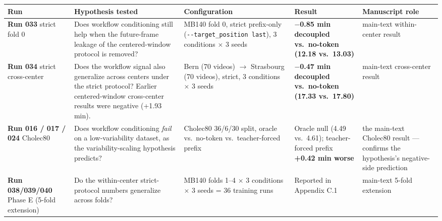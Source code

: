\begin{longtable}[]{@{}
  >{\raggedright\arraybackslash}p{}
  >{\raggedright\arraybackslash}p{}
  >{\raggedright\arraybackslash}p{}
  >{\raggedright\arraybackslash}p{}
  >{\raggedright\arraybackslash}p{}@{}}
\toprule\noalign{}
\begin{minipage}[b]{\linewidth}\raggedright
Run
\end{minipage} & \begin{minipage}[b]{\linewidth}\raggedright
Hypothesis tested
\end{minipage} & \begin{minipage}[b]{\linewidth}\raggedright
Configuration
\end{minipage} & \begin{minipage}[b]{\linewidth}\raggedright
Result
\end{minipage} & \begin{minipage}[b]{\linewidth}\raggedright
Manuscript role
\end{minipage} \\
\midrule\noalign{}
\endhead
\bottomrule\noalign{}
\endlastfoot
\textbf{Run 033} strict fold 0 & Does workflow conditioning still help
when the future-frame leakage of the centered-window protocol is
removed? & MB140 fold 0, strict prefix-only
(\texttt{-\/-target\_position\ last}), 3 conditions $\times$ 3 seeds &
\textbf{$-$0.85 min decoupled vs.~no-token (12.18 vs.~13.03)} & main-text within-center result \\
\textbf{Run 034} strict cross-center & Does the workflow signal also
generalize across centers under the strict protocol? Earlier
centered-window cross-center results were negative (+1.93 min). & Bern
(70 videos) $\rightarrow$ Strasbourg (70 videos), strict, 3 conditions $\times$ 3 seeds &
\textbf{$-$0.47 min decoupled vs.~no-token (17.33 vs.~17.80)} & main-text cross-center result \\
\textbf{Run 016 / 017 / 024} Cholec80 & Does workflow conditioning
\emph{fail} on a low-variability dataset, as the variability-scaling
hypothesis predicts? & Cholec80 36/6/30 split, oracle vs.~no-token
vs.~teacher-forced prefix & Oracle null (4.49 vs.~4.61); teacher-forced
prefix \textbf{+0.42 min worse} & the main-text Cholec80 result --- confirms the hypothesis's
negative-side prediction \\
\textbf{Run 038/039/040} Phase E (5-fold extension) & Do the
within-center strict-protocol numbers generalize across folds? & MB140
folds 1--4 $\times$ 3 conditions $\times$ 3 seeds = 36 training runs & Reported in
Appendix C.1 & main-text 5-fold extension \\
\end{longtable}

